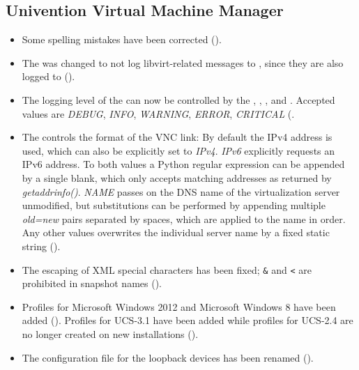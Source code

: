 \subsection{Univention Virtual Machine Manager}
\begin{itemize}
\item Some spelling mistakes have been corrected ().
\item The  was changed to not log libvirt-related messages to
  ,
  since they are also logged to
  ().

\item The logging level of the  can now be controlled
  by the , ,
  , and
  . Accepted values are \emph{DEBUG},
  \emph{INFO}, \emph{WARNING}, \emph{ERROR}, \emph{CRITICAL}
  (.

\item The  controls the format of the VNC
  link: By default the IPv4 address is used, which can also be
  explicitly set to \emph{IPv4}. \emph{IPv6} explicitly requests an
  IPv6 address. To both values a Python regular expression can be
  appended by a single blank, which only accepts matching addresses as
  returned by \emph{getaddrinfo()}. \emph{NAME} passes on the DNS name
  of the virtualization server unmodified, but substitutions can be
  performed by appending multiple \emph{old=new} pairs separated by
  spaces, which are applied to the name in order. Any other values
  overwrites the individual server name by a fixed static string
  ().

\item The escaping of XML special characters has been fixed;
  \texttt{\&} and \texttt{<} are prohibited in snapshot names
  ().

\item Profiles for Microsoft Windows 2012 and Microsoft Windows 8 have
  been added (). Profiles for UCS-3.1 have been added
  while profiles for UCS-2.4 are no longer created on new
  installations ().

\item The configuration file for the loopback devices has been renamed
  ().


\end{itemize}
